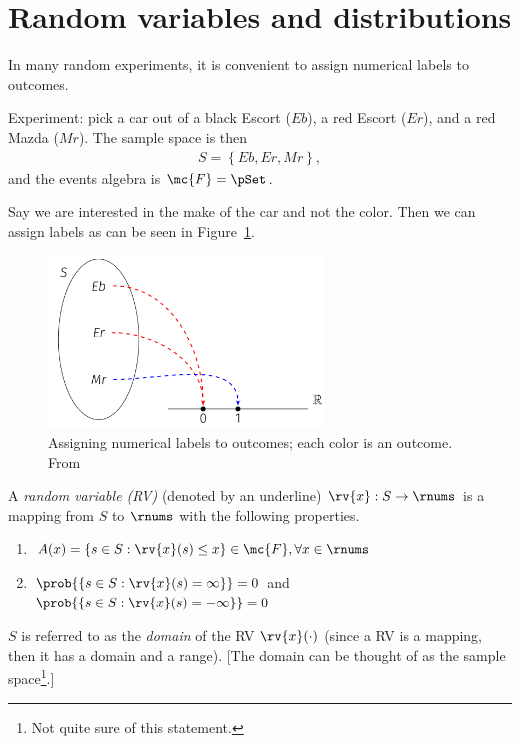 \section{Random variables and distributions}
In many random experiments, it is convenient to assign numerical labels to outcomes.
\begin{example}
    Experiment: pick a car out of a black Escort ($Eb$), a red Escort ($Er$), and a red Mazda ($Mr$).
    The sample space is then 
    \begin{align}
        S = \left\{ Eb, Er, Mr\right\},
    \end{align}
    and the events algebra is $\mc{F}=\pSet$.

    Say we are interested in the make of the car and not the color. Then we can assign labels as can be seen in Figure~\ref{fig:1 assigning numerical labels to outcomes}.
    \begin{figure}[h]
        \centering
        \includegraphics[width=0.65\textwidth]{figs/1_RV_example_labels_car.PNG}    
        \caption{Assigning numerical labels to outcomes; each color is an outcome. From~\cite{psaromiligkos_slides_2019}}
        \label{fig:1 assigning numerical labels to outcomes}
    \end{figure}
\end{example}
\begin{mydefinition}
  \label{def:random variable}
  A \emph{random variable (RV)} (denoted by an underline) $\rv{x}:S\to\rnums$ is a mapping from $S$ to $\rnums$ with the following properties.
  \begin{enumerate}
      \item $A(x) = \left\{ s\in S : \rv{x}(s)\leq x\right\}\in\mc{F}, \forall x\in\rnums$
      \item $\prob{\left\{ s\in S: \rv{x}(s)=\infty\right\}}=0$ and $\prob{\left\{ s\in S: \rv{x}(s)=-\infty\right\}}=0$
  \end{enumerate}
  $S$ is referred to as the \emph{domain} of the RV $\rv{x}(\cdot)$ (since a RV is a mapping, then it has a domain and a range). [The domain can be thought of as the sample space\footnote{Not quite sure of this statement.}.]
\end{mydefinition}
